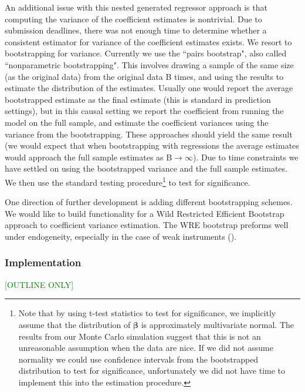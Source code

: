 \documentclass[12pt]{article}
\begin{document}
An additional issue with this nested generated regressor approach is that computing the variance of the coefficient estimates is nontrivial. Due to submission deadlines, there was not enough time to determine whether a consistent estimator for variance of the coefficient estimates exists. We resort to bootstrapping for variance. Currently we use the ``pairs bootstrap", also called ``nonparametric bootstrapping". This involves drawing a sample of the same size (as the original data) from the original data B times, and using the results to estimate the distribution of the estimates. Usually one would report the average bootstrapped estimate as the final estimate (this is standard in prediction settings), but in this causal setting we report the coefficient from running the model on the full sample, and estimate the coefficient variances using the variance from the bootstrapping. These approaches should yield the same result (we would expect that when bootstrapping with regressions the average estimates would approach the full sample estimates as $\mathrm{B} \longrightarrow \infty$). Due to time constraints we have settled on using the bootstrapped variance and the full sample estimates. We then use the standard testing procedure\footnote{Note that by using t-test statistics to test for significance, we implicitly assume that the distribution of $\bm{\beta}$ is approximately multivariate normal. The results from our Monte Carlo simulation suggest that this is not an unreasonable assumption when the data are nice. If we did not assume normality we could use confidence intervals from the bootstrapped distribution to test for significance, unfortunately we did not have time to implement this into the estimation procedure.} to test for significance.

One direction of further development is adding different bootstrapping schemes. We would like to build functionality for a Wild Restricted Efficient Bootstrap approach to coefficient variance estimation. The WRE bootstrap preforms well under endogeneity, especially in the case of weak instruments (\cite{wild_boot}).

\subsubsection{Implementation}
\textcolor{Green}{[OUTLINE ONLY]}
\end{document}
